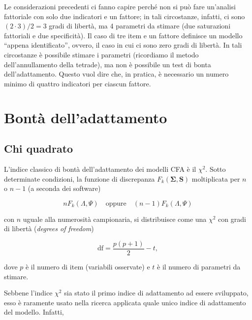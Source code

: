 \documentclass[
  11pt,
]{krantz}
\theoremstyle{definition}
\theoremstyle{definition}
\theoremstyle{definition}
\theoremstyle{definition}
\theoremstyle{remark}
\begin{document}
Le considerazioni precedenti ci fanno capire perché non si può fare un'analisi fattoriale con solo due indicatori e un fattore; in tali circostanze, infatti, ci sono \((2 \cdot 3)/2 = 3\) gradi di libertà, ma 4 parametri da stimare (due saturazioni fattoriali e due specificità). Il caso di tre item e un fattore definisce un modello ``appena identificato'', ovvero, il caso in cui ci sono zero gradi di libertà. In tali circostanze è possibile stimare i parametri (ricordiamo il metodo dell'annullamento della tetrade), ma non è possibile un test di bonta dell'adattamento. Questo vuol dire che, in pratica, è necessario un numero minimo di quattro indicatori per ciascun fattore.

\hypertarget{bontuxe0-delladattamento}{%
\section{Bontà dell'adattamento}\label{bontuxe0-delladattamento}}

\hypertarget{chi-quadrato}{%
\subsection{Chi quadrato}\label{chi-quadrato}}

L'indice classico di bontà dell'adattamento dei modelli CFA è il \(\chi^2\). Sotto determinate condizioni, la funzione di discrepanza \(F_{k}(\boldsymbol{\Sigma}, \boldsymbol{S})\) moltiplicata per \(n\) o \(n-1\) (a seconda dei software)

\[
n F_{k}(\Lambda, \Psi) \quad \text{oppure}\quad (n-1) F_{k}(\Lambda, \Psi)
\]

con \(n\) uguale alla numerosità campionaria, si distribuisce come una \(\chi^2\) con gradi di libertà (\emph{degrees of freedom})

\begin{equation}
\mbox{df} = \frac{p (p+1)}{2}-t,
\end{equation}

dove \(p\) è il numero di item (variabili osservate) e \(t\) è il numero di parametri da stimare.

Sebbene l'indice \(\chi^2\) sia stato il primo indice di adattamento ad essere sviluppato, esso è raramente usato nella ricerca applicata quale unico indice di adattamento del modello. Infatti,
\end{document}
